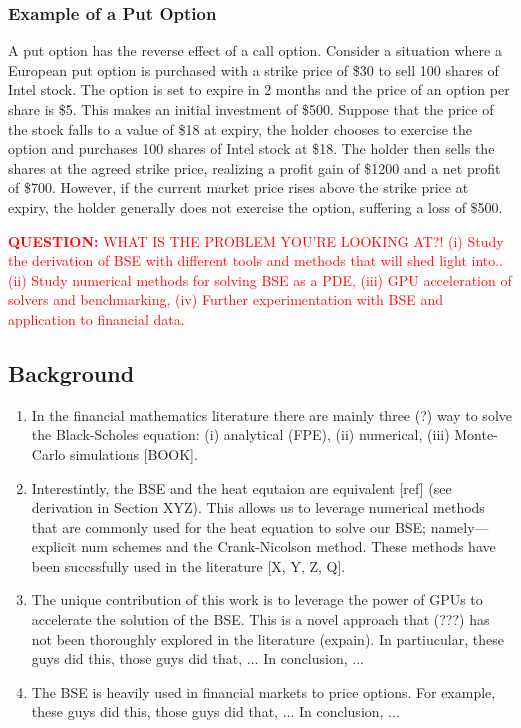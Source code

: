 \subsubsection{Example of a Put Option}
A put option has the reverse effect of a call option. Consider a situation where a European put option is purchased with a strike price of
\$30 to sell 100 shares of Intel stock. The option is set to expire in 2 months and the price of an option per share is \$5. This makes an initial
investment of \$500. Suppose that the price of the stock falls to a value of \$18 at expiry, the holder chooses to exercise the option and purchases 100
shares of Intel stock at \$18. The holder then sells the shares at the agreed strike price, realizing a profit gain of \$1200 and a net profit of \$700.
However, if the current market price rises above the strike price at expiry, the holder generally does not exercise the option, suffering a loss 
of \$500.

\textcolor{red}{\textbf{QUESTION:} WHAT IS THE PROBLEM YOU'RE LOOKING AT?!
(i) Study the derivation of BSE with different tools and methods that will shed light into..
(ii) Study numerical methods for solving BSE as a PDE,
(iii) GPU acceleration of solvers and benchmarking,
(iv) Further experimentation with BSE and application to financial data.}

\subsection{Background}
\begin{enumerate}
    \item In the financial mathematics literature there are mainly three (?) way to 
    solve the Black-Scholes equation: (i) analytical (FPE),
    (ii) numerical, (iii) Monte-Carlo simulations [BOOK].
    \item Interestintly, the BSE and the heat equtaion are equivalent [ref] 
    (see derivation in Section XYZ). This allows us to leverage numerical 
    methods that are commonly used for the heat equation to solve our BSE;
    namely---explicit num schemes and the Crank-Nicolson method.
    These methods have been succssfully used in the literature [X, Y, Z, Q].
    \item The unique contribution of this work is to leverage the power of GPUs
    to accelerate the solution of the BSE. This is a novel approach that (???)
    has not been thoroughly explored in the literature (expain).
    In partiucular, these guys did this, those guys did that, ... 
    In conclusion, ...
    \item The BSE is heavily used in financial markets to price options.
    For example, these guys did this, those guys did that, ... 
    In conclusion, ...
\end{enumerate}

